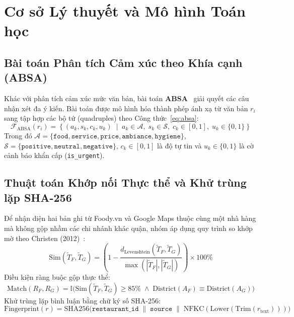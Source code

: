 \chapter{Cơ sở Lý thuyết và Mô hình Toán học}

\section{Bài toán Phân tích Cảm xúc theo Khía cạnh (ABSA)}
Khác với phân tích cảm xúc mức văn bản, bài toán \textbf{ABSA}~\cite{pontiki2014, zhang2022} giải quyết các câu nhận xét đa ý kiến. Bài toán được mô hình hóa thành phép ánh xạ từ văn bản $r_i$ sang tập hợp các bộ tứ (quadruples) theo Công thức~\eqref{eq:absa}:
\begin{equation}
\label{eq:absa}
    \mathcal{F}_{\text{ABSA}}(r_i) = \left\{ \left( a_k, s_k, c_k, u_k \right) \;\middle|\; a_k \in \mathcal{A},\; s_k \in \mathcal{S},\; c_k \in [0, 1],\; u_k \in \{0, 1\} \right\}
\end{equation}
Trong đó $\mathcal{A} = \{\texttt{food}, \texttt{service}, \texttt{price}, \texttt{ambiance}, \texttt{hygiene}\}$, $\mathcal{S} = \{\texttt{positive}, \texttt{neutral}, \texttt{negative}\}$, $c_k \in [0, 1]$ là độ tự tin và $u_k \in \{0, 1\}$ là cờ cảnh báo khẩn cấp (\texttt{is\_urgent}).

\section{Thuật toán Khớp nối Thực thể và Khử trùng lặp SHA-256}
Để nhận diện hai bản ghi từ Foody.vn và Google Maps thuộc cùng một nhà hàng mà không gộp nhầm các chi nhánh khác quận, nhóm áp dụng quy trình so khớp mờ theo Christen (2012)~\cite{christen2012}:
\begin{equation}
\label{eq:sim}
    \text{Sim}(\tilde{T}_F, \tilde{T}_G) = \left( 1 - \frac{d_{\text{Levenshtein}}(\tilde{T}_F, \tilde{T}_G)}{\max\left(|\tilde{T}_F|, |\tilde{T}_G|\right)} \right) \times 100\%
\end{equation}
Điều kiện ràng buộc gộp thực thể:
\begin{equation}
\label{eq:match}
    \text{Match}(R_F, R_G) = \mathbb{I}\Big( \text{Sim}(\tilde{T}_F, \tilde{T}_G) \ge 85\% \;\wedge\; \text{District}(A_F) \equiv \text{District}(A_G) \Big)
\end{equation}
Khử trùng lặp bình luận bằng chữ ký số SHA-256:
\begin{equation}
\label{eq:fingerprint}
    \text{Fingerprint}(r) = \text{SHA256}\Big( \texttt{restaurant\_id} \;\|\; \texttt{source} \;\|\; \text{NFKC}(\text{Lower}(\text{Trim}(r_{\text{text}}))) \Big)
\end{equation}

